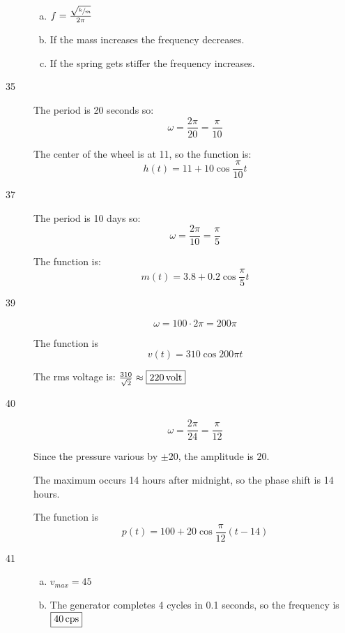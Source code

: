 \documentclass{exam}
\begin{document}
\begin{description}
\begin{enumerate}[(a)]
          \item $f = \frac{ \sqrt{\sfrac{k}{m}} }{2 \pi}$

          \item If the mass increases the frequency decreases.

          \item If the spring gets stiffer the frequency increases.

        \end{enumerate}

      \item[35] The period is 20 seconds so: 
        \[
          \omega = \frac{2 \pi}{20} = \frac{\pi}{10}
        \]

        The center of the wheel is at 11, so the function is:
        \[
          \boxed{ h(t) = 11 + 10 \cos \frac{\pi}{10} t }
        \]

      \item[37] The period is 10 days so: 
        \[
          \omega = \frac{2 \pi}{10} = \frac{\pi}{5}
        \]

        The function is:
        \[
          \boxed{ m(t) = 3.8 + 0.2 \cos \frac{\pi}{5} t }
        \]

      \item[39]
        \[
          \omega = 100 \cdot 2 \pi = 200 \pi
        \]

        The function is
        \[
          \boxed{ v(t) = 310 \cos 200 \pi t }
        \]

        The rms voltage is: $\frac{310}{\sqrt{2}} \approx \boxed{ \unit[ 220 ]{ volt } }$ 

      \item[40]
        \[
          \omega = \frac{2 \pi}{24} = \frac{\pi}{12}
        \]

        Since the pressure various by $\pm 20$, the amplitude is $20$.

        The maximum occurs 14 hours after midnight, so the phase shift is 14 hours.

        The function is
        \[
          \boxed{ p(t) = 100 + 20 \cos \frac{\pi}{12} (t - 14) }
        \]

      \item[41]
        \begin{enumerate}[(a)]
          \item $\boxed{ v_{max} = 45 }$

          \item The generator completes 4 cycles in 0.1 seconds, so the frequency is $\boxed{ \unit[ 40 ]{cps} }$


\end{enumerate}
\end{description}
\end{document}
